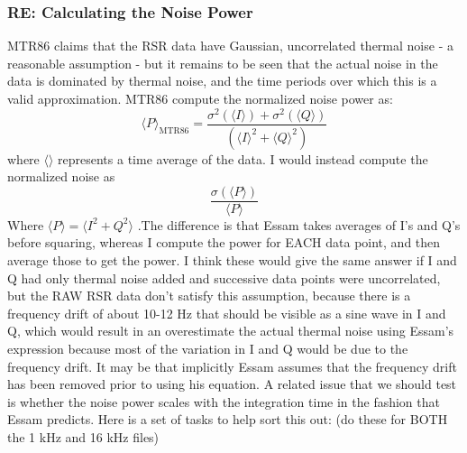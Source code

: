 \documentclass[crop=false,class=article,oneside]{standalone}
\begin{document}
\subsubsection{\footnotesize RE: Calculating the Noise Power}
MTR86 claims that the RSR data have Gaussian, uncorrelated thermal noise - a reasonable assumption - but it remains to be seen that the actual noise in the data is dominated by thermal noise, and the time periods over which this is a valid approximation. MTR86 compute the normalized noise power as:
\begin{equation}
\langle P \rangle_{\textrm{MTR86}} = \frac{\sigma^2(\langle I \rangle) + \sigma^2(\langle Q\rangle )}{(\langle I \rangle^2 + \langle Q \rangle^2)}
\end{equation}
where $\langle \rangle$ represents a time average of the data. I would instead compute the normalized noise as
\begin{equation*}
\frac{\sigma(\langle P \rangle)}{\langle P \rangle}
\end{equation*}
Where $\langle P \rangle = \langle I^2 + Q^2 \rangle$ .The difference is that Essam takes averages of I's and Q's before squaring, whereas I compute the power for EACH data point, and then average those to get the power. I think these would give the same answer if I and Q had only thermal noise added and successive data points were uncorrelated, but the RAW RSR data don't satisfy this assumption, because there is a frequency drift of about 10-12 Hz that should be visible as a sine wave in I and Q, which would result in an overestimate the actual thermal noise using Essam's expression because most of the variation in I and Q would be due to the frequency drift. It may be that implicitly Essam assumes that the frequency drift has been removed prior to using his equation. A related issue that we should test is whether the noise power scales with the integration time in the fashion that Essam predicts. Here is a set of tasks to help sort this out: (do these for BOTH the 1 kHz and 16 kHz files)
\end{document}
